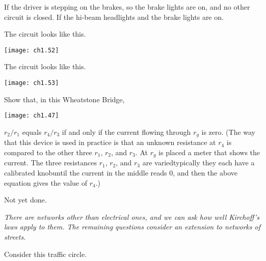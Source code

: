 \begin{exercises}
    \begin{exparts}
     \partsitem If the driver is stepping on the brakes, so the
       brake lights are on, and no other circuit is closed.
     \partsitem If the hi-beam headlights and the brake lights are on.
    \end{exparts}
    \begin{answer}
      \begin{exparts}
        \partsitem The circuit looks like this.
          \begin{center}
            \texttt{[image: ch1.52]}
          \end{center}
        \partsitem The circuit looks like this.
          \begin{center}
            \texttt{[image: ch1.53]}
          \end{center}
      \end{exparts}
    \end{answer}
\item \label{exer:WheatstoneBr} 
   Show that, in this Wheatstone Bridge, 
   \begin{center}
     \texttt{[image: ch1.47]}
   \end{center}
   $r_2/r_1$ equals $r_4/r_3$ if and only if the current
   flowing through $r_g$ is zero.
   (The way that this device is used in practice is that an unknown
   resistance at $r_4$ is compared to the other three 
   $r_1$, $r_2$, and $r_3$.
   At $r_g$ is placed a meter that shows the current.
   The three resistances $r_1$, $r_2$, and $r_3$ are varied\Dash typically
   they each have a calibrated knob\Dash until the 
   current in the middle reads $0$,
   and then the above equation gives the value of $r_4$.)
   \begin{answer}
     Not yet done.                             
   \end{answer}
\item[]\textit{There are networks other than electrical ones, and 
              we can ask how well Kirchoff's laws apply to them.
              The remaining questions consider an extension to 
              networks of streets.}
\item 
    Consider this traffic circle.
    \begin{center}

\end{center}
\end{exercises}
